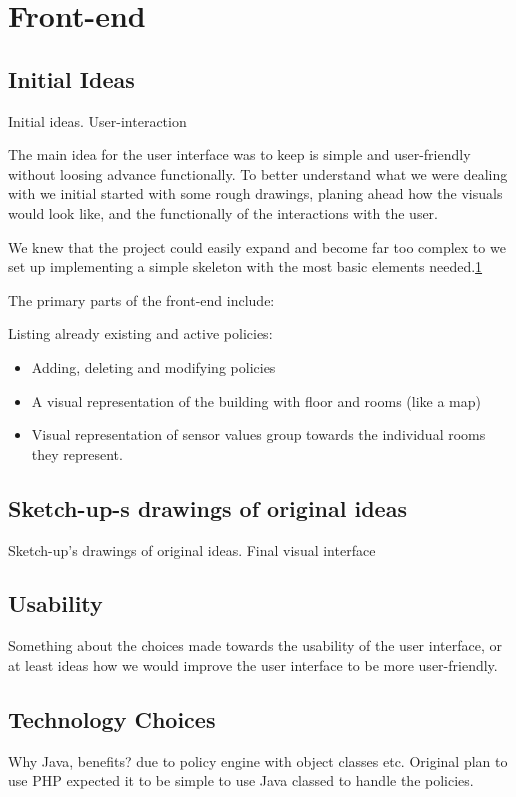 \section{Front-end}
\label{sec:front-end}
\subsection{Initial Ideas}
Initial ideas. User-interaction

The main idea for the user interface was to keep is simple and user-friendly without loosing advance functionally\cite{Krug:2005:DMM:1051204}. To better understand what we were dealing with we initial started with some rough drawings, planing ahead how the visuals would look like, and the functionally of the interactions with the user.

We knew that the project could easily expand and become far too complex to we set up implementing a simple skeleton with the most basic elements needed.\ref{sec:front-end}

The primary parts of the front-end include:

Listing already existing and active policies:
\begin{itemize}
\item Adding, deleting and modifying policies
\item A visual representation of the building with floor and rooms (like a map)
\item Visual representation of sensor values group towards the individual rooms they represent.
\end{itemize}



\subsection{Sketch-up-s drawings of original ideas}

	Sketch-up's drawings of original ideas.
	Final visual interface
	

\subsection{Usability}
Something about the choices made towards the usability of the user interface, or at least ideas how we would improve the user interface to be more user-friendly.


\subsection{Technology Choices}
Why Java, benefits? due to policy engine with object classes etc. Original plan to use PHP expected it to be simple to use Java classed to handle the policies.
